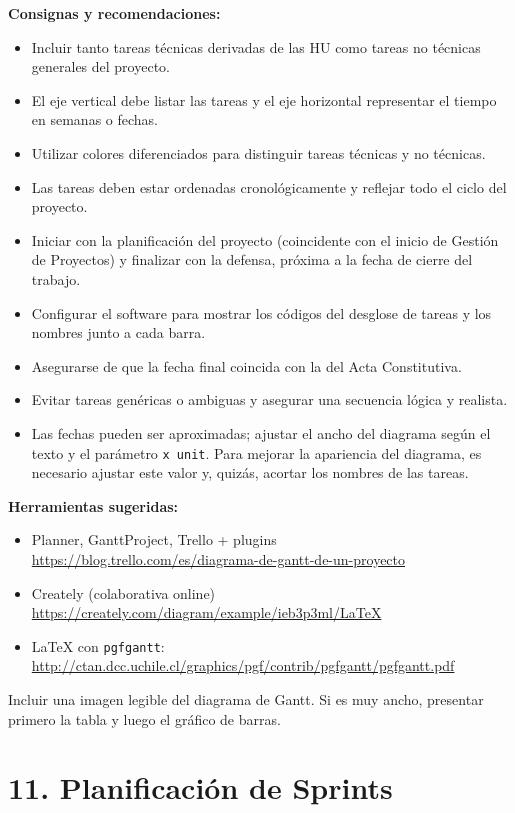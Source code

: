 \documentclass[
11pt, %
]{charter}
\begin{document}
\textbf{Consignas y recomendaciones:}
\begin{itemize}
  \item Incluir tanto tareas técnicas derivadas de las HU como tareas no técnicas generales del proyecto.
  \item El eje vertical debe listar las tareas y el eje horizontal representar el tiempo en semanas o fechas.
  \item Utilizar colores diferenciados para distinguir tareas técnicas y no técnicas.
  \item Las tareas deben estar ordenadas cronológicamente y reflejar todo el ciclo del proyecto.
  \item Iniciar con la planificación del proyecto (coincidente con el inicio de Gestión de Proyectos) y finalizar con la defensa, próxima a la fecha de cierre del trabajo.
  \item Configurar el software para mostrar los códigos del desglose de tareas y los nombres junto a cada barra.
  \item Asegurarse de que la fecha final coincida con la del Acta Constitutiva.
  \item Evitar tareas genéricas o ambiguas y asegurar una secuencia lógica y realista.
  \item Las fechas pueden ser aproximadas; ajustar el ancho del diagrama según el texto y el parámetro \texttt{x unit}. Para mejorar la apariencia del diagrama, es necesario ajustar este valor y, quizás, acortar los nombres de las tareas.
\end{itemize}

\textbf{Herramientas sugeridas:}
\begin{itemize}
  \item Planner, GanttProject, Trello + plugins\\
  \url{https://blog.trello.com/es/diagrama-de-gantt-de-un-proyecto}
  \item Creately (colaborativa online)\\
  \url{https://creately.com/diagram/example/ieb3p3ml/LaTeX}
  \item LaTeX con \texttt{pgfgantt}:\\
  \url{http://ctan.dcc.uchile.cl/graphics/pgf/contrib/pgfgantt/pgfgantt.pdf}
\end{itemize}

Incluir una imagen legible del diagrama de Gantt. Si es muy ancho, presentar primero la tabla y luego el gráfico de barras.

\section{11. Planificación de Sprints}
\end{document}
